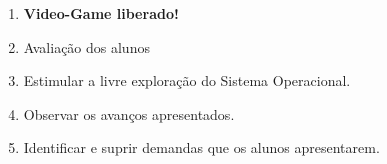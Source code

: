 \begin{enumerate}
	\item \textbf{Video-Game liberado!}
	\item Avaliação dos alunos
	\item Estimular a livre exploração do Sistema Operacional.
	\item Observar os avanços apresentados.
	\item Identificar e suprir demandas que os alunos apresentarem.
\end{enumerate}
